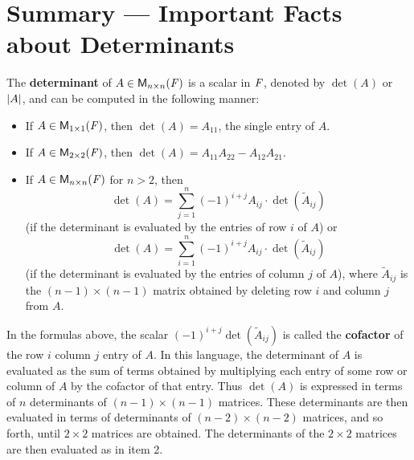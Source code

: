 \section{Summary --- Important Facts about Determinants}\label{sec:4.4}

\begin{note}
  The \textbf{determinant} of \(A \in \ms[n][n][\F]\) is a scalar in \(\mathit{F}\), denoted by \(\det(A)\) or \(\left\lvert A\right\rvert\), and can be computed in the following manner:
  \begin{itemize}
    \item If \(A \in \ms[1][1][\F]\), then \(\det(A) = A_{1 1}\), the single entry of \(A\).
    \item If \(A \in \ms[2][2][\F]\), then \(\det(A) = A_{1 1} A_{2 2} - A_{1 2} A_{2 1}\).
    \item If \(A \in \ms[n][n][\F]\) for \(n > 2\), then
          \[
            \det(A) = \sum_{j = 1}^n (-1)^{i + j} A_{i j} \cdot \det(\tilde{A}_{i j})
          \]
          (if the determinant is evaluated by the entries of row \(i\) of \(A\)) or
          \[
            \det(A) = \sum_{i = 1}^n (-1)^{i + j} A_{i j} \cdot \det(\tilde{A}_{i j})
          \]
          (if the determinant is evaluated by the entries of column \(j\) of \(A\)), where \(\tilde{A}_{i j}\) is the \((n - 1) \times (n - 1)\) matrix obtained by deleting row \(i\) and column \(j\) from \(A\).
  \end{itemize}
  In the formulas above, the scalar \((-1)^{i + j} \det(\tilde{A}_{i j})\) is called the \textbf{cofactor} of the row \(i\) column \(j\) entry of \(A\).
  In this language, the determinant of \(A\) is evaluated as the sum of terms obtained by multiplying each entry of some row or column of \(A\) by the cofactor of that entry.
  Thus \(\det(A)\) is expressed in terms of \(n\) determinants of \((n - 1) \times (n - 1)\) matrices.
  These determinants are then evaluated in terms of determinants of \((n - 2) \times (n - 2)\) matrices, and so forth, until \(2 \times 2\) matrices are obtained.
  The determinants of the \(2 \times 2\) matrices are then evaluated as in item 2.
\end{note}

